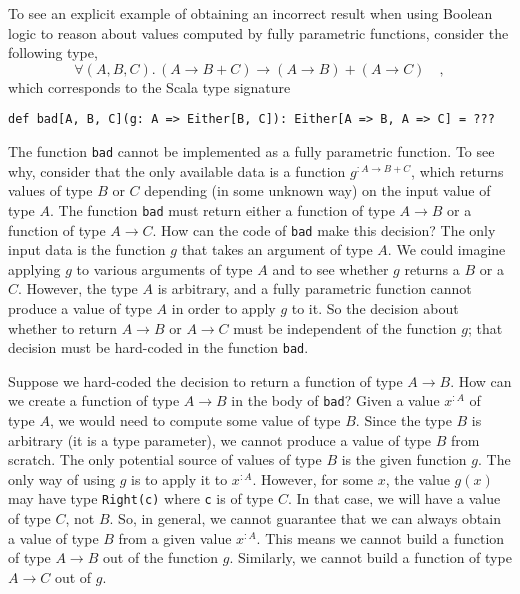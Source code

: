 To see an explicit example of obtaining an incorrect result when using
Boolean logic to reason about values computed by fully parametric
functions, consider the following type,
\begin{equation}
\forall(A,B,C).\,\left(A\rightarrow B+C\right)\rightarrow\left(A\rightarrow B\right)+\left(A\rightarrow C\right)\quad,\label{eq:ch-example-boolean-bad-type}
\end{equation}
which corresponds to the Scala type signature
\begin{lstlisting}
def bad[A, B, C](g: A => Either[B, C]): Either[A => B, A => C] = ???
\end{lstlisting}
The function \lstinline!bad! cannot be implemented as a fully parametric
function. To see why, consider that the only available data is a function
$g^{:A\rightarrow B+C}$, which returns values of type $B$ or $C$
depending (in some unknown way) on the input value of type $A$. The
function \lstinline!bad! must return either a function of type $A\rightarrow B$
or a function of type $A\rightarrow C$. How can the code of \lstinline!bad!
make this decision? The only input data is the function $g$ that
takes an argument of type $A$. We could imagine applying $g$ to
various arguments of type $A$ and to see whether $g$ returns a $B$
or a $C$. However, the type $A$ is arbitrary, and a fully parametric
function cannot produce a value of type $A$ in order to apply $g$
to it. So the decision about whether to return $A\rightarrow B$ or
$A\rightarrow C$ must be independent of the function $g$; that decision
must be hard-coded in the function \lstinline!bad!.

Suppose we hard-coded the decision to return a function of type $A\rightarrow B$.
How can we create a function of type $A\rightarrow B$ in the body
of \lstinline!bad!? Given a value $x^{:A}$ of type $A$, we would
need to compute some value of type $B$. Since the type $B$ is arbitrary
(it is a type parameter), we cannot produce a value of type $B$ from
scratch. The only potential source of values of type $B$ is the given
function $g$. The only way of using $g$ is to apply it to $x^{:A}$.
However, for some $x$, the value $g(x)$ may have type \lstinline!Right(c)!
where \lstinline!c! is of type $C$. In that case, we will have a
value of type $C$, not $B$. So, in general, we cannot guarantee
that we can always obtain a value of type $B$ from a given value
$x^{:A}$. This means we cannot build a function of type $A\rightarrow B$
out of the function $g$. Similarly, we cannot build a function of
type $A\rightarrow C$ out of $g$. 

